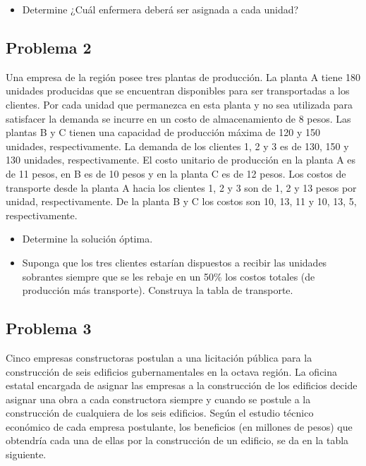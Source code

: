 \documentclass[letterpaper]{article}
\begin{document}
\begin{itemize}
\item Determine ¿Cuál enfermera deberá ser asignada a cada unidad?
\end{itemize}
\subsection*{Problema 2}
Una empresa de la región posee tres plantas de producción. La planta A tiene 180 unidades producidas que se encuentran disponibles para ser transportadas a los clientes. Por cada unidad que permanezca en esta planta y no sea utilizada para satisfacer la demanda se incurre en un costo de almacenamiento de 8 pesos. Las plantas B y C tienen una capacidad de producción máxima de 120 y 150 unidades, respectivamente. La demanda de los clientes 1, 2 y 3 es de 130, 150 y 130 unidades, respectivamente. El costo unitario de producción en la planta A es de 11 pesos, en B es de 10 pesos y en la planta C es de 12 pesos. Los costos de transporte desde la planta A hacia los clientes 1, 2 y 3 son de 1, 2 y 13 pesos por unidad, respectivamente. De la planta B y C los costos son 10, 13, 11 y 10, 13, 5, respectivamente. 

\begin{itemize}
\item Determine la solución óptima.
\item Suponga que los tres clientes estarían dispuestos a recibir las unidades sobrantes siempre que se les rebaje en un 50\% los costos totales (de producción más transporte). Construya la tabla de transporte.
\end{itemize}

\subsection*{Problema 3}
Cinco empresas constructoras postulan a una licitación pública para la construcción de seis edificios gubernamentales en la octava región. La oficina estatal encargada de asignar las empresas a la construcción de los edificios decide asignar una obra a cada constructora siempre y cuando se postule a la construcción de cualquiera de los seis edificios. Según el estudio técnico económico de cada empresa postulante, los beneficios (en millones de pesos) que obtendría cada una de ellas por la construcción de un edificio, se da en la tabla siguiente.
\end{document}
